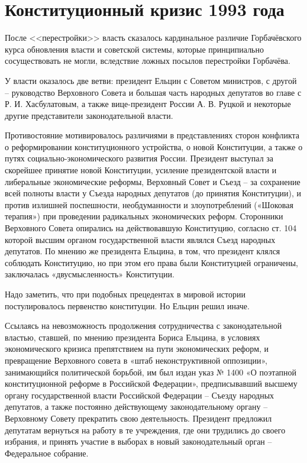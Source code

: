 \documentclass[a4paper,12pt]{diss_4}
\begin{document}
\chapter{Конституционный кризис 1993 года}

После <<перестройки>> власть сказалось кардинальное различие Горбачёвского курса обновления власти и советской системы, которые принципиально сосуществовать не могли, вследствие ложных посылов перестройки Горбачёва.

У власти оказалось две ветви: президент Ельцин с Советом министров, с другой -- руководство Верховного Совета и большая часть народных депутатов во главе с Р. И. Хасбулатовым, а также вице-президент России А. В. Руцкой и некоторые другие представители законодательной власти.

Противостояние мотивировалось различиями в представлениях сторон конфликта о реформировании конституционного устройства, о новой Конституции, а также о путях социально-экономического развития России. Президент выступал за скорейшее принятие новой Конституции, усиление президентской власти и либеральные экономические реформы, Верховный Совет и Съезд -- за сохранение всей полноты власти у Съезда народных депутатов (до принятия Конституции), и против излишней поспешности, необдуманности и злоупотреблений («Шоковая терапия») при проведении радикальных экономических реформ. Сторонники Верховного Совета опирались на действовавшую Конституцию, согласно ст. 104 которой высшим органом государственной власти являлся Съезд народных депутатов. По мнению же президента Ельцина, в том, что президент клялся соблюдать Конституцию, но при этом его права были Конституцией ограничены, заключалась «двусмысленность» Конституции.

Надо заметить, что при подобных прецедентах в мировой истории постулировалось первенство конституции. Но Ельцин решил иначе.

Ссылаясь на невозможность продолжения сотрудничества с законодательной властью, ставшей, по мнению президента Бориса Ельцина, в условиях экономического кризиса препятствием на пути экономических реформ, и превращение Верховного совета в «штаб неконструктивной оппозиции», занимающийся политической борьбой, им был издан указ № 1400 «О поэтапной конституционной реформе в Российской Федерации», предписывавший высшему органу государственной власти Российской Федерации -- Съезду народных депутатов, а также постоянно действующему законодательному органу -- Верховному Совету прекратить свою деятельность. Президент предложил депутатам вернуться на работу в те учреждения, где они трудились до своего избрания, и принять участие в выборах в новый законодательный орган -- Федеральное собрание.
\end{document}
